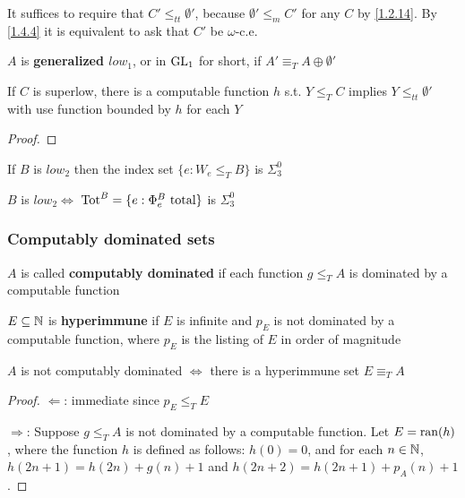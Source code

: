 \documentclass[11pt]{article}
\begin{document}
It suffices to require that \(C'\le_{tt}\emptyset'\), because \(\emptyset'\le_mC'\) for any \(C\) by \ref{1.2.14}. By
\ref{1.4.4} it is equivalent to ask that \(C'\) be \(\omega\)-c.e.

\begin{definition}[]
\(A\) is \textbf{generalized \(low_1\)}, or in \(\operatorname{GL}_1\) for short, if \(A'\equiv_TA\oplus\emptyset'\)
\end{definition}

\begin{exercise}
\label{1.5.5}
If \(C\) is superlow, there is a computable function \(h\) s.t. \(Y\le_TC\) implies \(Y\le_{tt}\emptyset'\)
with use function bounded by \(h\) for each \(Y\)
\end{exercise}

\begin{proof}

\end{proof}

\begin{exercise}
\label{1.5.7}
If \(B\) is \(low_2\) then the index set \(\{e:W_e\le_TB\}\) is \(\Sigma_3^0\)
\end{exercise}

\begin{exercise}
\label{1.5.8}
\(B\) is \(low_2 \Leftrightarrow\) \(\operatorname{Tot}^B=\{e:\Phi_e^B\text{ total}\}\) is \(\Sigma_3^0\)
\end{exercise}
\subsubsection{Computably dominated sets}
\label{sec:orge219fd4}
\begin{definition}[]
\(A\) is called \textbf{computably dominated} if each function \(g\le_TA\) is dominated by a computable
function
\end{definition}

\(E\subseteq\mathbb{N}\)  is \textbf{hyperimmune} if \(E\) is infinite and \(p_E\) is not dominated by a computable
function, where \(p_E\) is the listing of \(E\) in order of magnitude

\begin{proposition}[]
\(A\) is not computably dominated \(\Leftrightarrow\) there is a hyperimmune set \(E\equiv_TA\)
\end{proposition}

\begin{proof}
\(\Leftarrow\): immediate since \(p_E\le_TE\)

\(\Rightarrow\): Suppose \(g\le_TA\) is not dominated by a computable function. Let \(E=\operatorname{ran}(h)\), where the
function \(h\) is defined as follows: \(h(0)=0\), and for each \(n\in\mathbb{N}\), \(h(2n+1)=h(2n)+g(n)+1\)
and \(h(2n+2)=h(2n+1)+p_A(n)+1\).
\end{proof}
\end{document}
